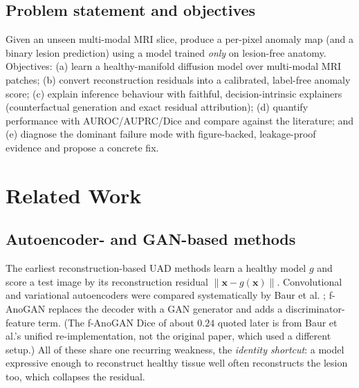 \documentclass[12pt, a4paper]{article}
\theoremstyle{definition}\newtheorem{definition}{Definition}
\newcommand{\x}{\bm{x}}
\begin{document}
\subsection{Problem statement and objectives}
Given an unseen multi-modal MRI slice, produce a per-pixel anomaly map (and a
binary lesion prediction) using a model trained \emph{only} on lesion-free anatomy.
Objectives: (a) learn a healthy-manifold diffusion model over multi-modal MRI
patches; (b) convert reconstruction residuals into a calibrated, label-free anomaly
score; (c) explain inference behaviour with faithful, decision-intrinsic
explainers (counterfactual generation and exact residual attribution); (d) quantify
performance with AUROC/AUPRC/Dice and compare
against the literature; and (e) diagnose the dominant failure mode with
figure-backed, leakage-proof evidence and propose a concrete fix.

\section{Related Work}
\subsection{Autoencoder- and GAN-based methods}
The earliest reconstruction-based UAD methods learn a healthy model $g$ and score a
test image by its reconstruction residual $\|\x-g(\x)\|$. Convolutional and variational
autoencoders were compared systematically by Baur et al. \cite{baur2021}; f-AnoGAN
\cite{schlegl2019} replaces the decoder with a GAN generator and adds a
discriminator-feature term. (The f-AnoGAN Dice of about $0.24$ quoted later is from
Baur et al.'s unified re-implementation, not the original paper, which used a different
setup.) All of these share one recurring weakness, the \emph{identity shortcut}: a model
expressive enough to reconstruct healthy tissue well often reconstructs the lesion too,
which collapses the residual.
\end{document}

